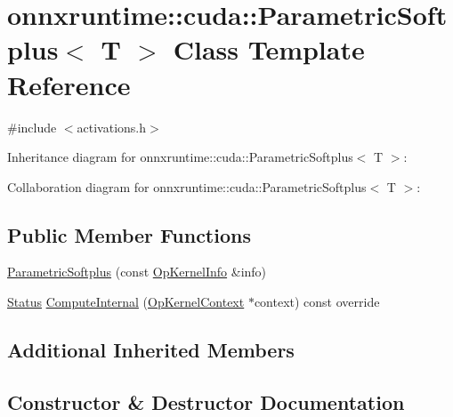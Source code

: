 \hypertarget{classonnxruntime_1_1cuda_1_1ParametricSoftplus}{}\section{onnxruntime\+:\+:cuda\+:\+:Parametric\+Softplus$<$ T $>$ Class Template Reference}
\label{classonnxruntime_1_1cuda_1_1ParametricSoftplus}


{\ttfamily \#include $<$activations.\+h$>$}



Inheritance diagram for onnxruntime\+:\+:cuda\+:\+:Parametric\+Softplus$<$ T $>$\+:


Collaboration diagram for onnxruntime\+:\+:cuda\+:\+:Parametric\+Softplus$<$ T $>$\+:
\subsection*{Public Member Functions}
\begin{DoxyCompactItemize}
\item 
\mbox{\hyperlink{classonnxruntime_1_1cuda_1_1ParametricSoftplus_a55f6890b4f4439a7df2e88ad4ea0acd7}{Parametric\+Softplus}} (const \mbox{\hyperlink{classonnxruntime_1_1OpKernelInfo}{Op\+Kernel\+Info}} \&info)
\item 
\mbox{\hyperlink{classonnxruntime_1_1common_1_1Status}{Status}} \mbox{\hyperlink{classonnxruntime_1_1cuda_1_1ParametricSoftplus_a54e8cfd42bcdef992b1a3418d5a4df2d}{Compute\+Internal}} (\mbox{\hyperlink{classonnxruntime_1_1OpKernelContext}{Op\+Kernel\+Context}} $\ast$context) const override
\end{DoxyCompactItemize}
\subsection*{Additional Inherited Members}


\subsection{Constructor \& Destructor Documentation}
\mbox{\label{classonnxruntime_1_1cuda_1_1ParametricSoftplus_a55f6890b4f4439a7df2e88ad4ea0acd7}} 
